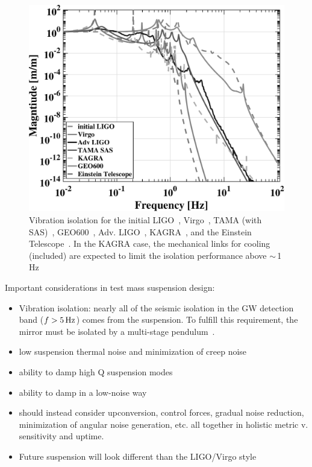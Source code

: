 \begin{figure}[h]
\centering
\includegraphics[width=\columnwidth]{Figures/SeismicIsolations-BW.pdf}
\caption{Vibration isolation for the initial LIGO~\cite{ponslet:432, Giaime:1996},
        Virgo~\cite{Stefano:2001, Virgo:SA2010, Accadia:2011jh},
        TAMA (with SAS)~\cite{Szabi:TAMASAS},
        GEO600~\cite{Hartmut:PhD, Ken:GEOseismic, plissi:3055},
        Adv. LIGO~\cite{aLIGO:Seismic2002},
        KAGRA~\cite{Somiya:2011tb}, and the
        Einstein Telescope~\cite{ET2011}. In the KAGRA case,
      the mechanical links for cooling (included) are expected to limit the
      isolation performance above $\sim$\,1\,Hz~\cite{Takahashi:email}}
\label{fig:SeismicTFs}
\end{figure}


Important considerations in test mass suspension design\cite{SUS:2012, Aston:2012}:
\begin{itemize}
   \item Vibration isolation: nearly all of the seismic isolation in the GW detection band ($f > 5\,\rm Hz$)
     comes from the suspension. To fulfill this requirement, the mirror must be isolated by a
     multi-stage pendulum~\cite{Beker:2011}.
   \item low suspension thermal noise and minimization of creep noise~\cite{Levin:2012ek, Gretarsson:2005gs}
   \item ability to damp high Q suspension modes
   \item ability to damp in a low-noise way
   \item should instead consider upconversion, control forces, gradual noise
      reduction, minimization of angular noise generation, etc. all together in
      holistic metric v. sensitivity and uptime.
   \item Future suspension will look different than the LIGO/Virgo style
\end{itemize}

